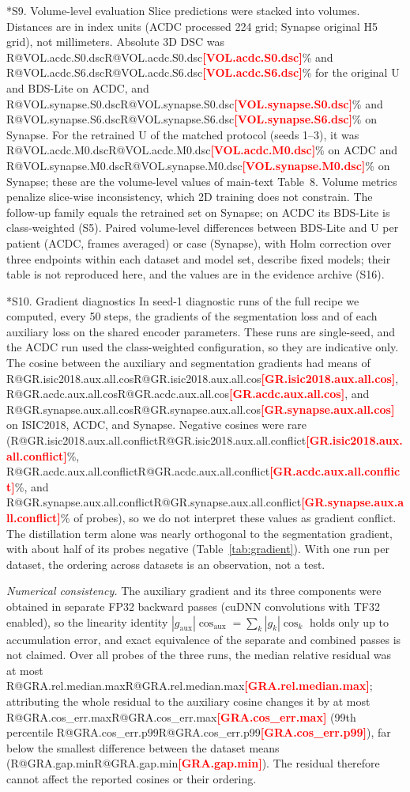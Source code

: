 \documentclass[10pt]{article}
\makeatletter
\newcommand{\R}[1]{\ifcsname R@#1\endcsname\csname R@#1\endcsname\else\textbf{\textcolor{red}{[#1]}}\fi}
\renewcommand\section{\@startsection{section}{1}{\z@}{-2.4ex \@plus -1ex \@minus -.2ex}{1.2ex \@plus .2ex}{\normalfont\large\bfseries}}
\makeatother
\begin{document}
\FloatBarrier
\section*{S9. Volume-level evaluation}
Slice predictions were stacked into volumes. Distances are in index units (ACDC processed 224 grid; Synapse original H5 grid), not millimeters. Absolute 3D DSC was \R{VOL.acdc.S0.dsc}\% and \R{VOL.acdc.S6.dsc}\% for the original U and BDS-Lite on ACDC, and \R{VOL.synapse.S0.dsc}\% and \R{VOL.synapse.S6.dsc}\% on Synapse. For the retrained U of the matched protocol (seeds 1--3), it was \R{VOL.acdc.M0.dsc}\% on ACDC and \R{VOL.synapse.M0.dsc}\% on Synapse; these are the volume-level values of main-text Table~8. Volume metrics penalize slice-wise inconsistency, which 2D training does not constrain. The follow-up family equals the retrained set on Synapse; on ACDC its BDS-Lite is class-weighted (S5). Paired volume-level differences between BDS-Lite and U per patient (ACDC, frames averaged) or case (Synapse), with Holm correction over three endpoints within each dataset and model set, describe fixed models; their table is not reproduced here, and the values are in the evidence archive (S16).


\section*{S10. Gradient diagnostics}
In seed-1 diagnostic runs of the full recipe we computed, every 50 steps, the gradients of the segmentation loss and of each auxiliary loss on the shared encoder parameters. These runs are single-seed, and the ACDC run used the class-weighted configuration, so they are indicative only. The cosine between the auxiliary and segmentation gradients had means of \R{GR.isic2018.aux.all.cos}, \R{GR.acdc.aux.all.cos}, and \R{GR.synapse.aux.all.cos} on ISIC2018, ACDC, and Synapse. Negative cosines were rare (\R{GR.isic2018.aux.all.conflict}\%, \R{GR.acdc.aux.all.conflict}\%, and \R{GR.synapse.aux.all.conflict}\% of probes), so we do not interpret these values as gradient conflict. The distillation term alone was nearly orthogonal to the segmentation gradient, with about half of its probes negative (Table~\ref{tab:gradient}). With one run per dataset, the ordering across datasets is an observation, not a test.

{\small}

\emph{Numerical consistency.} The auxiliary gradient and its three components were obtained in separate FP32 backward passes (cuDNN convolutions with TF32 enabled), so the linearity identity $|g_{\mathrm{aux}}|\cos_{\mathrm{aux}}=\sum_k|g_k|\cos_k$ holds only up to accumulation error, and exact equivalence of the separate and combined passes is not claimed. Over all probes of the three runs, the median relative residual was at most \R{GRA.rel.median.max}; attributing the whole residual to the auxiliary cosine changes it by at most \R{GRA.cos_err.max} (99th percentile \R{GRA.cos_err.p99}), far below the smallest difference between the dataset means (\R{GRA.gap.min}). The residual therefore cannot affect the reported cosines or their ordering.
\end{document}
